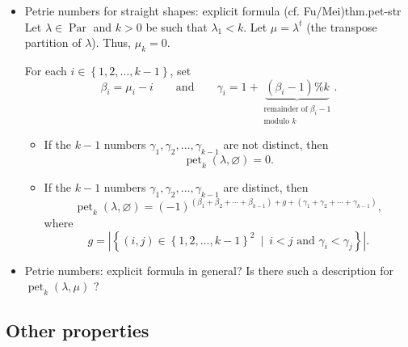 \documentclass[numbers=enddot,12pt,final,onecolumn,notitlepage]{scrartcl}%
\newcommand{\0}{\phantom{c}}
\newcommand{\nowbox}{\hphantom{x} \vspace{-1.5pc}}
\begin{document}
\begin{itemize}
\item \nowbox
\begin{theorem}{Petrie numbers for straight shapes: explicit formula (cf. Fu/Mei)}{thm.pet-str}
Let $\lambda\in\operatorname*{Par}$ and $k>0$ be such
that $\lambda_{1}<k$. Let $\mu=\lambda^{t}$ (the transpose partition of
$\lambda$). Thus, $\mu_{k}=0$.

For each $i\in\left\{  1,2,\ldots,k-1\right\}  $, set
\[
\beta_{i}=\mu_{i}-i\qquad\text{and}\qquad\gamma_{i}=1+\underbrace{\left(
\beta_{i}-1\right)  \%k}_{\substack{\text{remainder of }\beta_{i}%
-1\\\text{modulo }k}}.
\]

\begin{itemize}

\item If the $k-1$ numbers $\gamma_{1},\gamma_{2},\ldots,\gamma_{k-1}$
are not distinct, then
\[
\operatorname*{pet}\nolimits_{k}\left(  \lambda
,\varnothing\right)  =0 .
\]

\item If the $k-1$ numbers $\gamma_{1},\gamma_{2},\ldots,\gamma_{k-1}$
are distinct, then%
\[
\operatorname*{pet}\nolimits_{k}\left(  \lambda,\varnothing\right)  =\left(
-1\right)  ^{\left(  \beta_{1}+\beta_{2}+\cdots+\beta_{k-1}\right)  +g+\left(
\gamma_{1}+\gamma_{2}+\cdots+\gamma_{k-1}\right)  },
\]
where%
\[
g=\left\vert \left\{  \left(  i,j\right)  \in\left\{  1,2,\ldots,k-1\right\}
^{2}\ \mid\ i<j\text{ and }\gamma_{i}<\gamma_{j}\right\}  \right\vert .
\]
\end{itemize}
\end{theorem}


\item \nowbox
\begin{question}{Petrie numbers: explicit formula in general?}{}
Is there such a description for $\operatorname*{pet}%
\nolimits_{k}\left(  \lambda,\mu\right)  $ ?
\end{question}
\end{itemize}

\subsection{Other properties}
\end{document}
